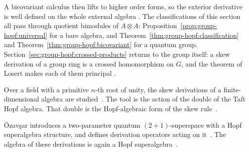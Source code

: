 A bicovariant calculus then lifts to higher order forms, so the exterior
derivative is well defined on the whole external algebra
\cite[p.~125]{Woronowicz1989}. The classifications of this section all pass
through quotient bimodules of $A\otimes A$:
Proposition~\ref{prop:group-hopf:universal} for a bare algebra, and
Theorem~\ref{thm:group-hopf:classification} and
Theorem~\ref{thm:group-hopf:bicovariant} for a quantum group.
Section~\ref{sec:group-hopf:crossed-products} returns to the group itself: a
skew derivation of a group ring is a crossed homomorphism on $G$, and the
theorem of Losert makes each of them principal \cite[p.~222]{Losert2008}.

Over a field with a primitive $n$-th root of unity, the skew derivations of a
finite-dimensional algebra are studied~\cite{WlSkewDerivationsOf2001}. The tool is the action of the double of
the Taft Hopf algebra. That double is the Hopf-algebraic form of the skew
rule~\cite{WlSkewDerivationsOf2001}.

\"Ozav\c{s}ar introduces a two-parameter quantum $(2+1)$-superspace with a
Hopf superalgebra structure, and defines derivation operators acting on it~\cite{WlATwoParameterQuantum21Superspa2013}. The
algebra of these derivations is again a Hopf
superalgebra~\cite{WlATwoParameterQuantum21Superspa2013}.
